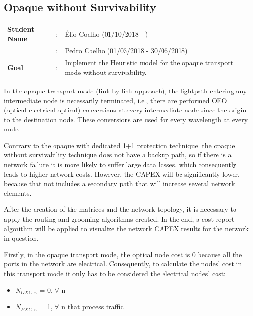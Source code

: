 \clearpage

\subsection{Opaque without Survivability}\label{heuristic_Opaque_Survivability}
\begin{tcolorbox}	
\begin{tabular}{p{2.75cm} p{0.2cm} p{10.5cm}} 	
\textbf{Student Name}   &:& \'Elio Coelho    (01/10/2018 - )\\
                        &:& Pedro Coelho   (01/03/2018 - 30/06/2018)\\
\textbf{Goal}           &:& Implement the Heuristic model for the opaque transport mode without survivability.
\end{tabular}
\end{tcolorbox}

\vspace{11pt}
In the opaque transport mode (link-by-link approach), the lightpath entering any intermediate node is necessarily terminated, i.e., there are performed OEO (optical-electrical-optical) conversions at every intermediate node since the origin to the destination node. These conversions are used for every wavelength at every node.

Contrary to the opaque with dedicated 1+1 protection technique, the opaque without survivability technique does not have a backup path, so if there is a network failure it is more likely to suffer large data losses, which consequently leads to higher network costs. However, the CAPEX will be significantly lower, because that not includes a secondary path that will increase several network elements.

After the creation of the matrices and the network topology, it is necessary to apply the routing and grooming algorithms created. In the end, a cost report algorithm will be applied to visualize the network CAPEX results for the network in question.

Firstly, in the opaque transport mode, the optical node cost is 0 because all the ports in the network are electrical. Consequently, to calculate the nodes' cost in this transport mode it only has to be considered the electrical nodes' cost:

\begin{itemize}
  \item $N_{OXC,n}$ = 0, \quad $\forall$ n
  \item $N_{EXC,n}$ = 1, \quad $\forall$ n that process traffic
\end{itemize}

